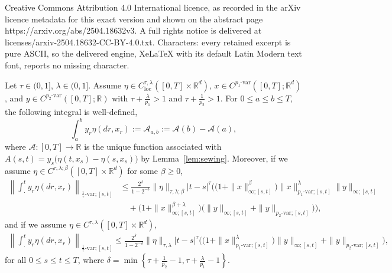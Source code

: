 \documentclass[10pt,a4paper]{amsart}
\def\R{\mathbb R}
\begin{document}
Creative Commons Attribution 4.0 International licence, as recorded in the arXiv licence metadata for this exact version and shown on the abstract page https://arxiv.org/abs/2504.18632v3. A full rights notice is delivered at licenses/arxiv-2504.18632-CC-BY-4.0.txt. Characters: every retained excerpt is pure ASCII, so the delivered engine, XeLaTeX with its default Latin Modern text font, reports no missing character.
\begin{proposition}\label{prop:bounds}
Let $ \tau\in(0, 1]$, $ \lambda\in(0,1]$. 
Assume $\eta\in C^{\tau,\lambda}_{\mathrm{loc}}([0,T]\times \mathbb{R}^{d})$, $x\in C^{p_{1}\text{-}\mathrm{var}}([0,T];\mathbb{R}^{d})$, and $y\in C^{p_{2}\text{-}\mathrm{var}}([0,T];\mathbb{R})$ with $\tau +\frac{\lambda}{p_{1}}>1$  and $\tau + \frac{1}{p_{2}}>1$.  For $0\le a\le b\le T$, the following integral is well-defined,		
\[\int_{a}^{b} y_r \eta(dr,x_r) := \mathcal{A}_{a,b} := \mathcal A(b)-\mathcal A(a),\] 
where $\mathcal{A}:[0,T]\to \R$ is the unique function associated with $A(s,t)= y_s\big(\eta(t,x_s) - \eta(s,x_s)\big)$ by Lemma~\ref{lem:sewing}. Moreover, if we assume $\eta\in C^{\tau,\lambda;\beta}([0,T]\times\mathbb{R}^{d})$ for some $\beta\ge 0$, 
\begin{equation}\label{e:p-var2}
\begin{aligned}
\left\|\int_{\cdot}^{t}y_{r}\eta(dr,x_{r})\right\|_{\frac{1}{\tau}\text{-}\mathrm{var};[s,t]}&\le \frac{2^{\delta}}{1-2^{-\delta}}\|\eta\|_{\tau,\lambda;\beta} |t-s|^{\tau} \bigg(\Big(1+\|x\|^{\beta}_{\infty;[s,t]}\Big)\|x\|^{\lambda}_{p_{1}\text{-}\mathrm{var};[s,t]}\|y\|_{\infty;[s,t]}\\ 
&\quad +  \Big(1+\|x\|^{\beta+\lambda}_{\infty;[s,t]}\Big)\Big(\|y\|_{\infty;[s,t]}+\|y\|_{p_{2}\text{-}\mathrm{var};[s,t]}\Big)\bigg),
\end{aligned}
\end{equation}
and if we assume $\eta \in C^{\tau,\lambda}([0,T]\times\mathbb{R}^{d})$, 
\begin{equation}\label{e:p-var1}
\begin{aligned} 
\left\|\int_{\cdot}^{t}y_{r}\eta(dr,x_{r})\right\|_{\frac{1}{\tau}\text{-}\mathrm{var};[s,t]}\le \frac{2^{\delta}}{1-2^{-\delta}}\|\eta\|_{\tau,\lambda} |t-s|^{\tau} \bigg(\Big(1+\|x\|^{\lambda}_{p_{1}\text{-}\mathrm{var};[s,t]}\Big)\|y\|_{\infty;[s,t]} + \|y\|_{p_{2}\text{-}\mathrm{var};[s,t]} \bigg),
\end{aligned} 
\end{equation}
for all $0\le s\le t\le T$, where $\delta = \min\left\{\tau+\frac{1}{p_{2}}-1,\tau+\frac{\lambda}{p_{1}}-1\right\}$.
\end{proposition}
\end{document}
